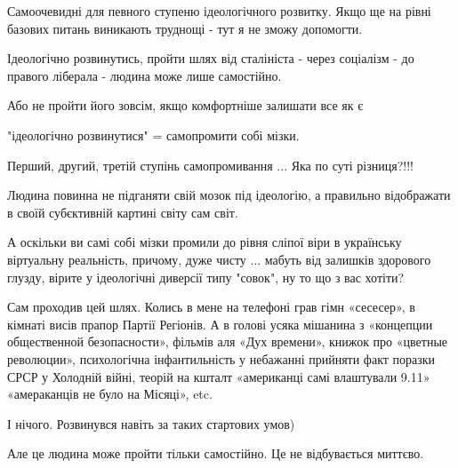 \begin{itemize}
\begin{itemize}
Самоочевидні для певного ступеню ідеологічного розвитку. Якщо ще на рівні
базових питань виникають труднощі - тут я не зможу допомогти.

Ідеологічно розвинутись, пройти шлях від сталініста - через соціалізм - до
правого ліберала - людина може лише самостійно.

Або не пройти його зовсім, якщо комфортніше залишати все як є


 

"ідеологічно розвинутися" = самопромити собі мізки.

Перший, другий, третій ступінь самопромивання ... Яка по суті різниця?!!!

Людина повинна не підганяти свій мозок під ідеологію, а правильно відображати в
своїй субєктивній картині світу сам світ.

А оскільки ви самі собі мізки промили до рівня сліпої віри в українську
віртуальну реальність, причому, дуже чисту ... мабуть від залишків здорового
глузду, вірите у ідеологічні диверсії типу "совок", ну то що з вас хотіти?

 

Сам проходив цей шлях. Колись в мене на телефоні грав гімн «сесесер», в кімнаті
висів прапор Партії Регіонів. А в голові усяка мішанина з «концепции
общественной безопасности», фільмів аля «Дух времени», книжок про «цветные
революции», психологічна інфантильність у небажанні прийняти факт поразки СРСР
у Холодній війні, теорій на кшталт «американці самі влаштували 9.11»
«амераканців не було на Місяці», etc.

І нічого. Розвинувся навіть за таких стартових умов)

Але це людина може пройти тільки самостійно. Це не відбувається миттєво.

 


\end{itemize}
\end{itemize}
